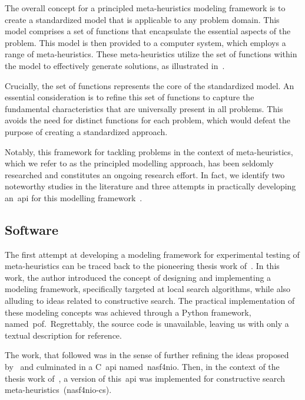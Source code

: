 The overall concept for a principled meta-heuristics modeling framework is to
create a standardized model that is applicable to any problem domain. This model
comprises a set of functions that encapsulate the essential aspects of the
problem. This model is then provided to a computer system, which employs a range
of meta-heuristics. These meta-heuristics utilize the set of functions within
the model to effectively generate solutions, as illustrated in~.

Crucially, the set of functions represents the core of the standardized model.
An essential consideration is to refine this set of functions to capture the
fundamental characteristics that are universally present in all problems. This
avoids the need for distinct functions for each problem, which would defeat the
purpose of creating a standardized approach.

Notably, this framework for tackling problems in the context of meta-heuristics,
which we refer to as the principled modelling approach, has been seldomly
researched and constitutes an ongoing research effort. In fact, we identify two
noteworthy studies in the literature and three attempts in practically
developing an~\acrfull{api} for this modelling
framework~\cite{vieira2009uma,outeiro2021application,fonseca2021nasf4nio}.

\subsection{Software}

The first attempt at developing a modeling framework for experimental testing of
meta-heuristics can be traced back to the pioneering thesis work
of~\citet{vieira2009uma}. In this work, the author introduced the concept of
designing and implementing a modeling framework, specifically targeted at local
search algorithms, while also alluding to ideas related to constructive search.
The practical implementation of these modeling concepts was achieved through a
Python framework, named~\acrfull{pof}.~Regrettably, the source code is
unavailable, leaving us with only a textual description for reference.

The work, that followed was in the sense of further refining the ideas proposed
by~\citet{vieira2009uma} and culminated in a C~\acrshort{api}
named~\acrfull{nasf4nio}. Then, in the context of the thesis work
of~\citet{outeiro2021application}, a version of this~\acrshort{api} was
implemented for constructive search meta-heuristics~(\acrshort{nasf4nio-cs}).

